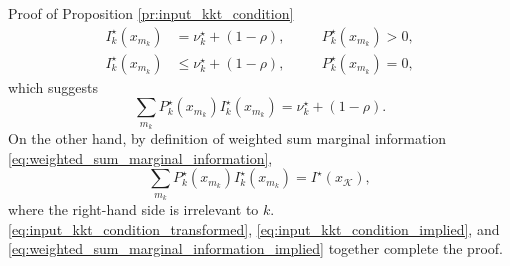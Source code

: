 \documentclass[journal]{IEEEtran}
\begin{document}
\begin{appendix}
\begin{subsection}{Proof of Proposition \ref{pr:input_kkt_condition}}
		\begin{subequations}
			\label{eq:input_kkt_condition_transformed}
			\begin{alignat}{2}
				I_k^\star(x_{m_k}) & = \nu_k^\star + (1 - \rho), \quad   &  & P_k^\star(x_{m_k}) > 0,\label{eq:probable_states_marginal} \\
				I_k^\star(x_{m_k}) & \le \nu_k^\star + (1 - \rho), \quad &  & P_k^\star(x_{m_k}) = 0,\label{eq:dropped_states_marginal}
			\end{alignat}
		\end{subequations}
		which suggests
		\begin{equation}
			\sum_{m_k} P_k^\star(x_{m_k}) I_k^\star(x_{m_k}) = \nu_k^\star + (1 - \rho).
			\label{eq:input_kkt_condition_implied}
		\end{equation}
		On the other hand, by definition of weighted sum marginal information \eqref{eq:weighted_sum_marginal_information},
		\begin{equation}
			\sum_{m_k} P_k^\star(x_{m_k}) I_k^\star(x_{m_k}) = I^\star(x_{\mathcal{K}}),
			\label{eq:weighted_sum_marginal_information_implied}
		\end{equation}
		where the right-hand side is irrelevant to $k$.
		\eqref{eq:input_kkt_condition_transformed}, \eqref{eq:input_kkt_condition_implied}, and \eqref{eq:weighted_sum_marginal_information_implied} together complete the proof.
		\label{ap:input_kkt_condition}
	\end{subsection}


\end{appendix}
\end{document}
